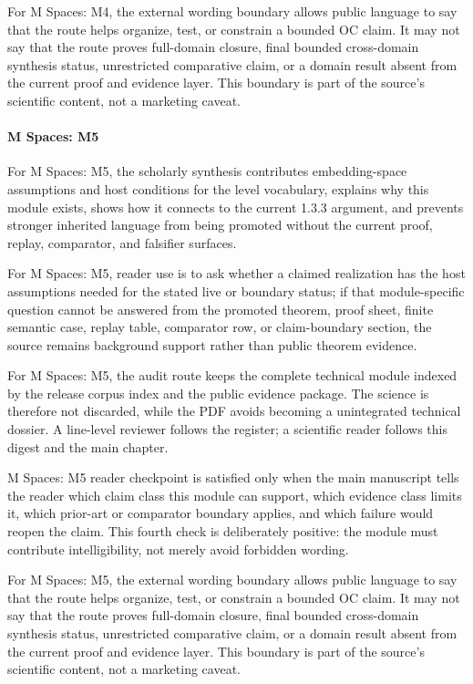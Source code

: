 For M Spaces: M4, the external wording boundary allows public language to say that the route helps organize, test, or constrain a bounded OC claim. It may not say that the route proves full-domain closure, final bounded cross-domain synthesis status, unrestricted comparative claim, or a domain result absent from the current proof and evidence layer. This boundary is part of the source's scientific content, not a marketing caveat.


\paragraph{M Spaces: M5}

For M Spaces: M5, the scholarly synthesis contributes embedding-space assumptions and host conditions for the level vocabulary, explains why this module exists, shows how it connects to the current 1.3.3 argument, and prevents stronger inherited language from being promoted without the current proof, replay, comparator, and falsifier surfaces.


For M Spaces: M5, reader use is to ask whether a claimed realization has the host assumptions needed for the stated live or boundary status; if that module-specific question cannot be answered from the promoted theorem, proof sheet, finite semantic case, replay table, comparator row, or claim-boundary section, the source remains background support rather than public theorem evidence.


For M Spaces: M5, the audit route keeps the complete technical module indexed by the release corpus index and the public evidence package. The science is therefore not discarded, while the PDF avoids becoming a unintegrated technical dossier. A line-level reviewer follows the register; a scientific reader follows this digest and the main chapter.


M Spaces: M5 reader checkpoint is satisfied only when the main manuscript tells the reader which claim class this module can support, which evidence class limits it, which prior-art or comparator boundary applies, and which failure would reopen the claim. This fourth check is deliberately positive: the module must contribute intelligibility, not merely avoid forbidden wording.


For M Spaces: M5, the external wording boundary allows public language to say that the route helps organize, test, or constrain a bounded OC claim. It may not say that the route proves full-domain closure, final bounded cross-domain synthesis status, unrestricted comparative claim, or a domain result absent from the current proof and evidence layer. This boundary is part of the source's scientific content, not a marketing caveat.


